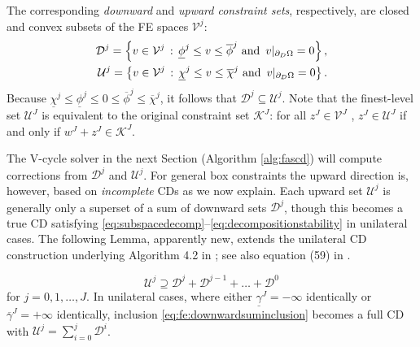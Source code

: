 \documentclass[review,hidelinks,onefignum,onetabnum,final]{siamart220329}  %
\begin{document}
The corresponding \emph{downward} and \emph{upward constraint sets}, respectively, are closed and convex subsets of the FE spaces $\mathcal{V}^j$:
\begin{align}
\mathcal{D}^j = \left\{v \in \mathcal{V}^j \,:\, \underline{\phi}^j \le v \le \overline{\phi}^j \text{ and } \, v|_{\partial_D\Omega} = 0\right\}, \label{eq:fe:constraintsets} \\
\mathcal{U}^j = \left\{v \in \mathcal{V}^j \,:\, \underline{\chi}^j \le v \le \overline{\chi}^j \text{ and } \, v|_{\partial_D\Omega} = 0\right\}. \notag
\end{align}
Because $\underline{\chi}^j \le \underline{\phi}^j \le 0 \le \overline{\phi}^j \le \overline{\chi}^j$, it follows that $\mathcal{D}^j \subseteq \mathcal{U}^j$.  Note that the finest-level set $\mathcal{U}^J$ is equivalent to the original constraint set $\mathcal{K}^J$: for all $z^J \in \mathcal{V}^J$ , $z^J \in \mathcal{U}^J$ if and only if $w^J+z^J \in \mathcal{K}^J$.

The V-cycle solver in the next Section (Algorithm \ref{alg:fascd}) will compute corrections from $\mathcal{D}^j$ and $\mathcal{U}^j$.  For general box constraints the upward direction is, however, based on \emph{incomplete} CDs as we now explain.  Each upward set $\mathcal{U}^j$ is generally only a superset of a sum of downward sets $\mathcal{D}^j$, though this becomes a true CD satisfying \eqref{eq:subspacedecomp}--\eqref{eq:decompositionstability} in unilateral cases.  The following Lemma, apparently new, extends the unilateral CD construction underlying Algorithm 4.2 in \cite{GraeserKornhuber2009}; see also equation (59) in \cite{Tai2003}.

\begin{lemma}  \label{lem:downwardadmissibility}
\begin{equation}
\mathcal{U}^j \supseteq \mathcal{D}^j + \mathcal{D}^{j-1} + \dots + \mathcal{D}^0 \label{eq:fe:downwardsuminclusion}
\end{equation}
for $j=0,1,\dots,J$.  In unilateral cases, where either $\underline{\gamma}^J=-\infty$ identically or $\overline{\gamma}^J=+\infty$ identically, inclusion \eqref{eq:fe:downwardsuminclusion} becomes a full CD with $\mathcal{U}^j=\sum_{i=0}^j \mathcal{D}^i$.
\end{lemma}
\end{document}
